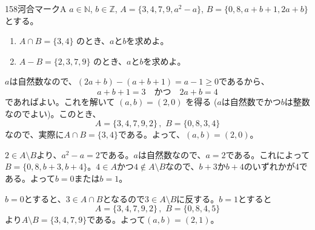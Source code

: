 \begin{prob}{158}{}{河合マークA}
 $a\in\mathbb{N}$, $b\in\mathbb{Z}$, $A=\{3, 4, 7, 9, a^2-a\}$, $B=\{0, 8, a+b+1, 2a+b\}$ とする。
 \begin{enumerate}
  \item $A\cap B = \{3, 4\}$ のとき、$a$と$b$を求めよ。
  \item $A-B = \{2, 3, 7, 9\}$ のとき、$a$と$b$を求めよ。
 \end{enumerate}
\end{prob}
$a$は自然数なので、$(2a+b)-(a+b+1)=a-1\ge 0$であるから、
\[ a+b+1=3 \quad\text{かつ}\quad 2a+b=4 \]
であればよい。これを解いて $(a, b)=(2, 0)$ を得る ($a$は自然数でかつ$b$は整数なのでよい)。このとき、
\[ A=\{3, 4, 7, 9, 2\} \,,\,\, B=\{0, 8, 3, 4\} \]
なので、実際に$A\cap B=\{3, 4\}$である。よって、$(a, b)=(2, 0)$。

$2\in A\setminus B$より、$a^2-a=2$である。$a$は自然数なので、$a=2$である。これによって$B=\{0, 8, b+3, b+4\}$。$4\in A$かつ$4\notin A\setminus B$なので、$b+3$か$b+4$のいずれかが4である。よって$b=0$または$b=1$。

$b=0$とすると、$3\in A\cap B$となるので$3\in A\setminus B$に反する。$b=1$とすると
\[ A=\{3, 4, 7, 9, 2\} \,,\,\, B=\{0, 8, 4, 5\} \]
より$A\setminus B=\{3, 4, 7, 9\}$である。よって$(a, b)=(2, 1)$。